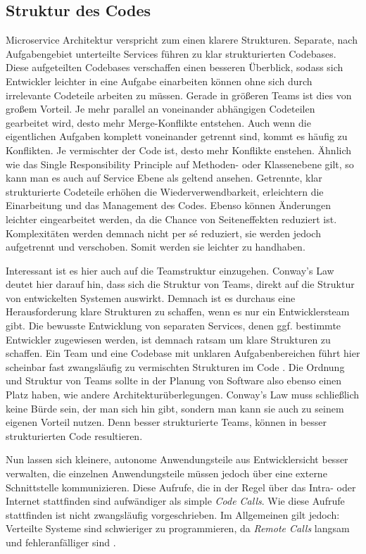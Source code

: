 \subsection{Struktur des Codes}
Microservice Architektur verspricht zum einen klarere Strukturen. Separate, nach Aufgabengebiet unterteilte Services führen zu klar strukturierten Codebases. Diese aufgeteilten Codebases verschaffen einen besseren Überblick, sodass sich Entwickler leichter in eine Aufgabe einarbeiten können ohne sich durch irrelevante Codeteile arbeiten zu müssen. Gerade in größeren Teams ist dies von großem Vorteil. Je mehr parallel an voneinander abhängigen Codeteilen gearbeitet wird, desto mehr Merge-Konflikte entstehen. Auch wenn die eigentlichen Aufgaben komplett voneinander getrennt sind, kommt es häufig zu Konflikten. Je vermischter der Code ist, desto mehr Konflikte enstehen. Ähnlich wie das Single Responsibility Principle auf Methoden- oder Klassenebene gilt, so kann man es auch auf Service Ebene als geltend ansehen. Getrennte, klar strukturierte Codeteile erhöhen die Wiederverwendbarkeit, erleichtern die Einarbeitung und das Management des Codes. Ebenso können Änderungen leichter eingearbeitet werden, da die Chance von Seiteneffekten reduziert ist. Komplexitäten werden demnach nicht per sé reduziert, sie werden jedoch aufgetrennt und verschoben. Somit werden sie leichter zu handhaben.

Interessant ist es hier auch auf die Teamstruktur einzugehen. Conway's Law \cite{conwayslaw} deutet hier darauf hin, dass sich die Struktur von Teams, direkt auf die Struktur von entwickelten Systemen auswirkt. Demnach ist es durchaus eine Herausforderung klare Strukturen zu schaffen, wenn es nur ein Entwicklersteam gibt. Die bewusste Entwicklung von separaten Services, denen ggf. bestimmte Entwickler zugewiesen werden, ist demnach ratsam um klare Strukturen zu schaffen. Ein Team und eine Codebase mit unklaren Aufgabenbereichen führt hier scheinbar fast zwangsläufig zu vermischten Strukturen im Code \cite{conwayslaw}.
Die Ordnung und Struktur von Teams sollte in der Planung von Software also ebenso einen Platz haben, wie andere Architekturüberlegungen. Conway's Law muss schließlich keine Bürde sein, der man sich hin gibt, sondern man kann sie auch zu seinem eigenen Vorteil nutzen. Denn besser strukturierte Teams, können in besser strukturierten Code resultieren.

Nun lassen sich kleinere, autonome Anwendungsteile aus Entwicklersicht besser verwalten, die einzelnen Anwendungsteile müssen jedoch über eine externe Schnittstelle kommunizieren. Diese Aufrufe, die in der Regel über das Intra- oder Internet stattfinden sind aufwändiger als simple \textit{Code Calls}. Wie diese Aufrufe stattfinden ist nicht zwangsläufig vorgeschrieben. Im Allgemeinen gilt jedoch: Verteilte Systeme sind schwieriger zu programmieren, da \textit{Remote Calls} langsam und fehleranfälliger sind \cite[vgl.][]{Fowler:Guide}.

